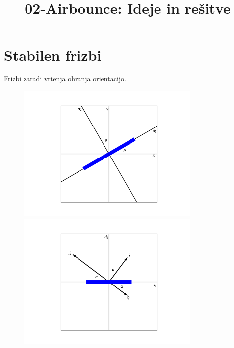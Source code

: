 \documentclass[11pt,a4paper]{article}
\title{02-Airbounce: Ideje in rešitve}
\date{}
\begin{document}
\maketitle

\section{Stabilen frizbi}
Frizbi zaradi vrtenja ohranja orientacijo.

\begin{figure}[H]
	\centering
	\begin{minipage}{.5\textwidth}
	  \centering
	  \includegraphics[width=9cm]{graf_osi.png}
	\end{minipage}%
	\begin{minipage}{.5\textwidth}
	  \centering
	  \includegraphics[width=9cm]{osi_frisbeeja.png}
	\end{minipage}
\end{figure}
\end{document}
